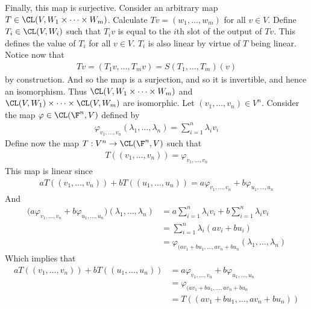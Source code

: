 \documentclass{book}
\begin{document}
\begin{enumerate}[label=\arabic*)]
      Finally, this map is surjective. Consider an arbitrary map $T \in \CL(V, W_1\times\dots\times W_m)$. Calculate $Tv = (w_1, \dots, w_m)$ for all $v \in V$. Define $T_i \in \CL(V, W_i)$
      such that $T_iv$ is equal to the $i$th slot of the output of $Tv$. This defines the value of $T_i$ for all $v \in V$. $T_i$ is also linear by virtue of $T$ being linear. Notice now
      that 
      \begin{align*}
        Tv = (T_1v, \dots, T_mv) = S(T_1, \dots, T_m)(v) 
      \end{align*}
      by construction. And so the map is a surjection, and so it is invertible, and hence an isomorphism. Thus $\CL(V, W_1\times\dots\times W_m)$ and $\CL(V, W_1)\times\dots\times\CL(V,
      W_m)$ are isomorphic.
    \ii
      Let $(v_1, \dots, v_n) \in V^n$. Consider the map $\varphi \in \CL(\F^n, V)$ defined by 
      \begin{align*}
        \varphi_{v_1, \dots, v_n}(\lambda_1, \dots, \lambda_n) = \sum_{i = 1}^{n}\lambda_iv_i 
      \end{align*}
      Define now the map $T: V^n \to \CL(\F^n, V)$ such that
      \begin{align*}
        T\left((v_1, \dots, v_n)\right) = \varphi_{v_1, \dots, v_n}
      \end{align*}
      This map is linear since 
      \begin{align*}
        aT\left((v_1, \dots, v_n)\right) + bT\left((u_1, \dots, u_n)\right) = a\varphi_{v_1, \dots, v_n} + b\varphi_{u_1, \dots, u_n}
      \end{align*}
      And
      \begin{align*}
        \big(a\varphi_{v_1, \dots, v_n} + b\varphi_{u_1, \dots, u_n}\big)(\lambda_1, \dots, \lambda_n) & = a\sum_{i = 1}^{n}\lambda_iv_i + b\sum_{i = 1}^{n}\lambda_iv_i \\
        & = \sum_{i = 1}^{n}\lambda_i(av_i + bu_i) \\
        & = \varphi_{(av_1 + bu_1, \dots, av_n + bu_n}(\lambda_1, \dots, \lambda_n)
      \end{align*}
      Which implies that 
      \begin{align*}
        aT\left((v_1, \dots, v_n)\right) + bT\left((u_1, \dots, u_n)\right) & =  a\varphi_{v_1, \dots, v_n} + b\varphi_{u_1, \dots, u_n} \\
        & = \varphi_{(av_1 + bu_1, \dots, av_n + bu_n} \\
        & = T\left((av_1 + bu_1, \dots, av_n + bu_n)\right)
      \end{align*}

\end{enumerate}
\end{document}

